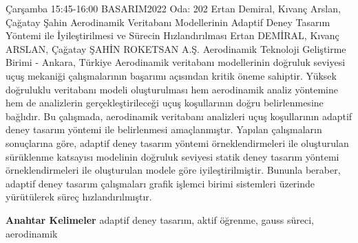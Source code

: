
    \begin{abstract_basarim}
    {Çarşamba 15:45-16:00}
    {BASARIM2022}
    {Oda: 202}
    {Ertan Demiral, Kıvanç Arslan, Çağatay Şahin}
    {Aerodinamik Veritabanı Modellerinin Adaptif Deney Tasarım Yöntemi ile İyileştirilmesi ve Sürecin Hızlandırılması}
    {%
    Ertan DEMİRAL, Kıvanç ARSLAN, Çağatay ŞAHİN}
    {%
    }
    {%
    ROKETSAN A.Ş. Aerodinamik Teknoloji Geliştirme Birimi - Ankara, Türkiye}
    Aerodinamik veritabanı modellerinin doğruluk seviyesi uçuş mekaniği çalışmalarının başarımı açısından kritik öneme sahiptir. Yüksek doğruluklu veritabanı modeli oluşturulması hem aerodinamik analiz yöntemine hem de analizlerin gerçekleştirileceği uçuş koşullarının doğru belirlenmesine bağlıdır. Bu çalışmada, aerodinamik veritabanı analizleri uçuş koşullarının adaptif deney tasarım yöntemi ile belirlenmesi amaçlanmıştır. Yapılan çalışmaların sonuçlarına göre, adaptif deney tasarım yöntemi örneklendirmeleri ile oluşturulan sürüklenme katsayısı modelinin doğruluk seviyesi statik deney tasarım yöntemi örneklendirmeleri ile oluşturulan modele göre iyileştirilmiştir. Bununla beraber, adaptif deney tasarım çalışmaları grafik işlemci birimi sistemleri üzerinde yürütülerek süreç hızlandırılmıştır. 
    
            \textbf{Anahtar Kelimeler} \newline{}adaptif deney tasarım, aktif öğrenme, gauss süreci, aerodinamik
    \end{abstract_basarim}
    